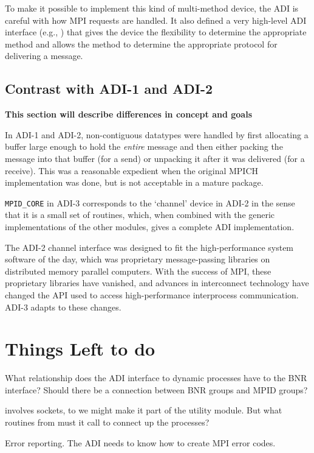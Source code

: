 \documentclass{article}
\begin{document}
To make it possible to implement this kind of multi-method device, the
ADI is careful with how MPI requests are handled.  It also defined a
very high-level ADI interface (e.g., ) that gives the
device the flexibility to determine the appropriate method and allows
the method to determine the appropriate protocol for delivering a message.

\subsection{Contrast with ADI-1 and ADI-2}
\label{sec-historical}
\textbf{This section will describe differences in concept and goals}

In ADI-1 and ADI-2, non-contiguous datatypes were handled by first
allocating a buffer large enough to hold the \emph{entire} message and
then either packing the message into that buffer (for a send) or
unpacking it after it was delivered (for a receive).  This was a
reasonable expedient when the original MPICH implementation was done,
but is not acceptable in a mature package.

\texttt{MPID_CORE} in ADI-3 corresponds to the `channel' device in ADI-2 in
the sense that it is a small set of routines, which, when combined with the
generic implementations of the other modules, gives a complete ADI
implementation.  

The ADI-2 channel interface was designed to fit the high-performance system
software of the day, which was proprietary message-passing libraries on
distributed memory parallel computers.  With the success of MPI, these
proprietary libraries have vanished, and advances in interconnect technology
have changed the API used to access high-performance interprocess
communication.  ADI-3 adapts to these changes.

\section{Things Left to do}
What relationship does the ADI interface to dynamic processes 
have to the BNR interface?  Should there be a connection between BNR groups
and MPID groups?


 involves sockets, to we might make it part of the
utility module.  But what routines from  must it call
to connect up the processes?

Error reporting.  The ADI needs to know how to create MPI error codes.

%
\end{document}
